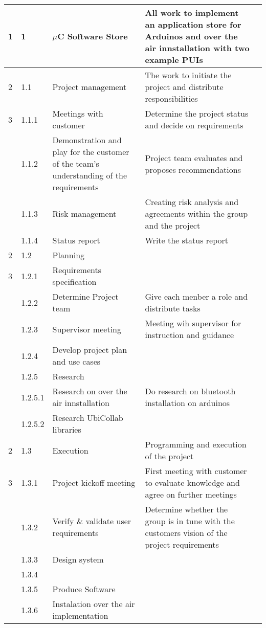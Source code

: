 \begin{longtable}{|m{}|m{}|m{}|m{}|m{}|}
	1 & 1 & $\mu$C Software Store & All work to implement an application store for Arduinos and over the air innstallation with two example PUIs & \\
\hline
	2 & 1.1 & Project management & The work to initiate the project and distribute responsibilities & \\
\hline
	3 & 1.1.1 & Meetings with customer & Determine the project status and decide on requirements & \\
	 & 1.1.2 & Demonstration and play for the customer of the team's understanding of the requirements & Project team evaluates and proposes recommendations & \\
\hline
	 & 1.1.3 & Risk management & Creating risk analysis and agreements within the group and the project & \\
\hline
	 & 1.1.4 & Status report & Write the status report & \\
\hline
	2 & 1.2 & Planning & & \\
\hline
	3 & 1.2.1 & Requirements specification & & \\
\hline
	 & 1.2.2 & Determine Project team & Give each menber a role and distribute tasks & \\
\hline
	 & 1.2.3 & Supervisor meeting & Meeting wih supervisor for instruction and guidance & \\
\hline
	 & 1.2.4 & Develop project plan and use cases & & \\
\hline
	 & 1.2.5 & Research & & \\
\hline
	 & 1.2.5.1 & Research on over the air innstallation & Do research on bluetooth installation on arduinos & \\
\hline
	 & 1.2.5.2 & Research UbiCollab libraries & & \\
\hline
	2 & 1.3 & Execution & Programming and execution of the project & \\
\hline
	3 & 1.3.1 & Project kickoff meeting & First meeting with customer to evaluate knowledge and agree on further meetings & \\
\hline
	 & 1.3.2 & Verify \& validate user requirements & Determine whether the group is in tune with the customers vision of the project requirements & \\
\hline
	 & 1.3.3 & Design system & & \\
\hline	  
	 & 1.3.4 & & & \\
\hline
	 & 1.3.5 & Produce Software & & \\
\hline
	 & 1.3.6 & Instalation over the air implementation & & \\

\end{longtable}
